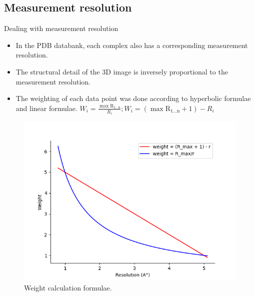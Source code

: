 \documentclass{beamer}
\begin{document}
\subsection{Measurement resolution}
\begin{frame}[t]{Dealing with measurement resolution}
\begin{itemize}
\item In the PDB databank,  each complex also has a corresponding measurement resolution.
\item The structural
detail of the 3D image is inversely proportional to the measurement
resolution.
\item The weighting of each data point was done according to hyperbolic formulae and linear formulae.
$  W_i = \frac{ \mathrm{\max{R_{1 ...  n}}}}{R_i}  ;  W_i = (\mathrm{\max{R_{1 ...  n}}} + 1) - R_i $
\end{itemize}

\begin{figure}
     \centering
         \centering
    \includegraphics[scale=0.3]{images/graphingformula}
    \caption{Weight calculation formulae.}
    \label{fig:graphingformula}
\end{figure}

\end{frame}
\end{document}
